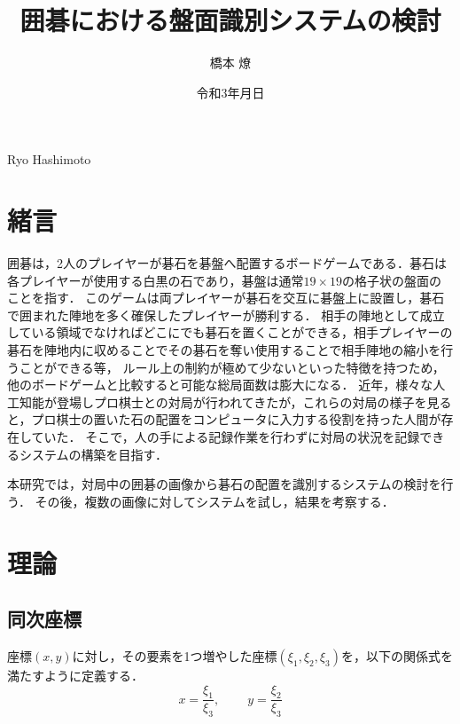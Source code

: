\documentclass[summary]{nitocs}
\numberwithin{equation}{section}
\begin{document}
    \title{囲碁における盤面識別システムの検討}
    \author{橋本 燎}{Ryo Hashimoto} %

    \date{令和3年\number\month 月\number\day 日} 

    \maketitle
    \section{緒言} \label{intro}
        囲碁は，2人のプレイヤーが碁石を碁盤へ配置するボードゲームである．碁石は各プレイヤーが使用する白黒の石であり，碁盤は通常$19\times19$の格子状の盤面のことを指す．
        このゲームは両プレイヤーが碁石を交互に碁盤上に設置し，碁石で囲まれた陣地を多く確保したプレイヤーが勝利する．
        相手の陣地として成立している領域でなければどこにでも碁石を置くことができる，相手プレイヤーの碁石を陣地内に収めることでその碁石を奪い使用することで相手陣地の縮小を行うことができる等，
        ルール上の制約が極めて少ないといった特徴を持つため，他のボードゲームと比較すると可能な総局面数は膨大になる．        
        近年，様々な人工知能が登場しプロ棋士との対局が行われてきたが，これらの対局の様子を見ると，プロ棋士の置いた石の配置をコンピュータに入力する役割を持った人間が存在していた．
        そこで，人の手による記録作業を行わずに対局の状況を記録できるシステムの構築を目指す．

        本研究では，対局中の囲碁の画像から碁石の配置を識別するシステムの検討を行う．
        その後，複数の画像に対してシステムを試し，結果を考察する．

    \section{理論} \label{theory}
        \subsection{同次座標}
            座標$(x,y)$に対し，その要素を1つ増やした座標$(\xi_1,\xi_2,\xi_3)$を，以下の関係式を満たすように定義する．\\
            \begin{equation} %
                    x = \frac{\xi_1}{\xi_3}, \;\;\;\;\;\;\;\; y = \frac{\xi_2}{\xi_3}
                \label{Homogeneous}
            \end{equation}
\end{document}
